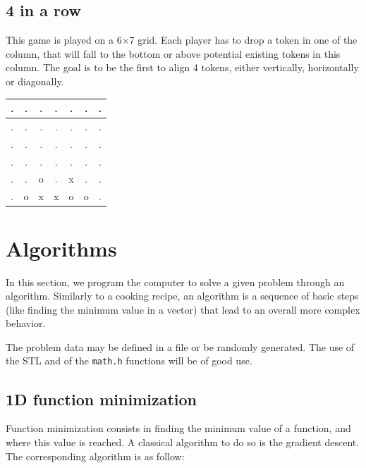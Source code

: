 \documentclass{ecnreport}
\begin{document}
\subsection{4 in a row}

This game is played on a 6$\times$7 grid. Each player has to drop a token in one of the column, that will fall to the bottom or above potential existing tokens in this column.
The goal is to be the first to align 4 tokens, either vertically, horizontally or diagonally.

\begin{center}
 \begin{tabular}{|c|c|c|c|c|c|c|}
 \hline  
 . &.&.&.&. &.&.\\\hline
 . &.&.&.&. &.&.\\\hline
 . &.&.&.&. &.&.\\\hline
 . &.&.&.&. &.&.\\\hline
 . &.&o&.&x &.&.\\\hline
 . &o&x&x&o &o&.\\\hline
 \end{tabular}
\end{center}
\begin{itemize}
\end{itemize}

\section{Algorithms}

In this section, we program the computer to solve a given problem through an algorithm. Similarly to a cooking recipe, an algorithm is a sequence of basic steps (like finding the minimum value in a vector) that lead to an overall more complex behavior.

The problem data may be defined in a file or be randomly generated.
The use of the STL and of the \texttt{math.h} functions will be of good use. 

\subsection{1D function minimization}

Function minimization consists in finding the minimum value of a function, and where this value is reached. A classical algorithm to do so is the gradient descent. The corresponding algorithm is as follow:
\end{document}
